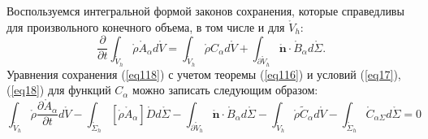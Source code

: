 Воспользуемся интегральной формой законов сохранения, которые справедливы для произвольного конечного объема, в том числе и для $\mathring{V}_h$:
\begin{equation}\label{eq118}
\frac{\partial}{\partial t}\int_{\mathring{V}_h}\mathring{\rho}\mathring{A}_\alpha d\mathring{V}=\int_{\mathring{V}_h}\mathring{\rho}C_\alpha d\mathring{V}+\int_{\partial\mathring{V}_h}\mathring{\mathbf{n}}\cdot\mathring{B}_\alpha d\mathring{\Sigma}.
\end{equation}
Уравнения сохранения (\ref{eq118}) с учетом теоремы (\ref{eq116}) и условий (\ref{eq17}), (\ref{eq18}) для функций $C_\alpha$ можно записать следующим образом:
\begin{equation}\label{eq119}
\int_{\mathring{V}_{h}}\mathring{\rho} \frac{\partial \mathring{A}_{\alpha}}{\partial t}d\mathring{V}-\int_{\mathring{\Sigma}_{h}}[\mathring{\rho}\mathring{A}_{\alpha}]\mathring{D}d\mathring{\Sigma}-\int_{\partial\mathring{V}_{h}}\mathring{\mathbf{n}}\cdot\mathring{B}_{\alpha}d\mathring{\Sigma}-\int_{\mathring{V}_{h}}\mathring{\rho}\tilde{C}_{\alpha}d\mathring{V}-\int_{\mathring{\Sigma}_{h}}\mathring{C}_{\alpha\Sigma}d\mathring{\Sigma}=0
\end{equation}

